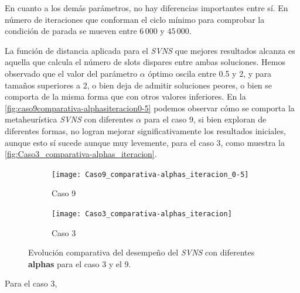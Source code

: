 En cuanto a los demás parámetros, no hay diferencias importantes entre sí. En número de iteraciones que conforman el ciclo mínimo para comprobar la condición de parada se mueven entre $6\,000$ y $45\,000$.

La función de distancia aplicada para el \textit{SVNS} que mejores resultados alcanza es aquella que calcula el número de slots dispares entre ambas soluciones. Hemos observado que el valor del parámetro $\alpha$ óptimo oscila entre 0.5 y 2, y para tamaños superiores a 2, o bien deja de admitir soluciones peores, o bien se comporta de la misma forma que con otros valores inferiores. En la \autoref{fig:caso9comparativa-alphasiteracion0-5} podemos observar cómo se comporta la metaheurística \textit{SVNS} con diferentes $\alpha$ para el caso 9, si bien exploran de diferentes formas, no logran mejorar significativamente los resultados iniciales, aunque esto sí sucede aunque muy levemente, para el caso 3, como muestra la
\autoref{fig:Caso3_comparativa-alphas_iteracion}.

\begin{figure}
	\begin{subfigure}{\linewidth}
	\texttt{[image: Caso9\_comparativa-alphas\_iteracion\_0-5]}
	\caption{Caso 9}
	\label{fig:caso9comparativa-alphasiteracion0-5}
	\centering
	\end{subfigure}

	\begin{subfigure}{\linewidth}
	\texttt{[image: Caso3\_comparativa-alphas\_iteracion]}
	\caption{Caso 3}
	\label{fig:Caso3_comparativa-alphas_iteracion}
	\centering
\end{subfigure}
	\caption{Evolución comparativa del desempeño del \textit{SVNS} con diferentes \textbf{alphas} para el caso 3 y el 9.}
\end{figure}

Para el caso 3, 

%
%

